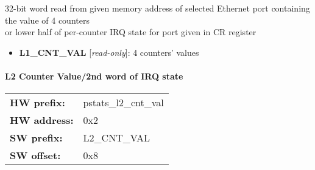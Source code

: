 \vspace{12pt}
32-bit word read from given memory address of selected Ethernet port containing the value of 4 counters \\                   or lower half of per-counter IRQ state for port given in CR register

\vspace{12pt}
\noindent
{}

\begin{itemize}
\item \begin{small}
{\bf 
L1\_CNT\_VAL
} [\emph{read-only}]: 4 counters' values
\end{small}
\end{itemize}
\paragraph*{L2 Counter Value/2nd word of IRQ state}\vspace{12pt}

\begin{tabular}{l l }
{\bf HW prefix:}  & pstats\_l2\_cnt\_val\\
{\bf HW address:}  & 0x2\\
{\bf SW prefix:}  & L2\_CNT\_VAL\\
{\bf SW offset:}  & 0x8\\
\end{tabular}

